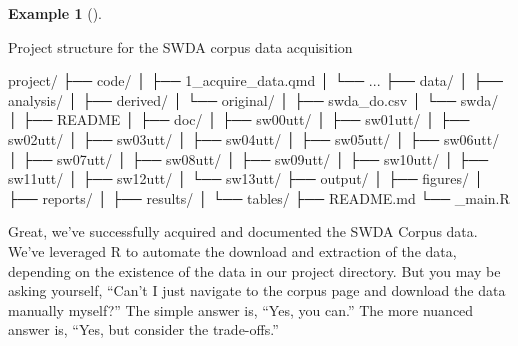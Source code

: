 \documentclass[
  letterpaper,
  DIV=11,
  numbers=noendperiod]{scrreport}
\newenvironment{Shaded}{\begin{snugshade}}{\end{snugshade}}
\newcommand{\ExtensionTok}[1]{\textcolor[rgb]{0.00,0.00,0.00}{#1}}
\newcommand{\NormalTok}[1]{\textcolor[rgb]{0.00,0.00,0.00}{#1}}
\theoremstyle{definition}
\newtheorem{example}{Example}[chapter]
\theoremstyle{remark}
\begin{document}
\begin{example}[]\protect\hypertarget{exm-ad-swda-structure}{}\label{exm-ad-swda-structure}

Project structure for the SWDA corpus data acquisition

\begin{Shaded}
\begin{Highlighting}[]
\ExtensionTok{project/}
\ExtensionTok{├──}\NormalTok{ code/}
\ExtensionTok{│}\NormalTok{   ├── 1\_acquire\_data.qmd}
\ExtensionTok{│}\NormalTok{   └── ...}
\ExtensionTok{├──}\NormalTok{ data/}
\ExtensionTok{│}\NormalTok{   ├── analysis/}
\ExtensionTok{│}\NormalTok{   ├── derived/}
\ExtensionTok{│}\NormalTok{   └── original/}
\ExtensionTok{│}\NormalTok{       ├── swda\_do.csv}
\ExtensionTok{│}\NormalTok{       └── swda/}
\ExtensionTok{│}\NormalTok{          ├── README}
\ExtensionTok{│}\NormalTok{          ├── doc/}
\ExtensionTok{│}\NormalTok{          ├── sw00utt/}
\ExtensionTok{│}\NormalTok{          ├── sw01utt/}
\ExtensionTok{│}\NormalTok{          ├── sw02utt/}
\ExtensionTok{│}\NormalTok{          ├── sw03utt/}
\ExtensionTok{│}\NormalTok{          ├── sw04utt/}
\ExtensionTok{│}\NormalTok{          ├── sw05utt/}
\ExtensionTok{│}\NormalTok{          ├── sw06utt/}
\ExtensionTok{│}\NormalTok{          ├── sw07utt/}
\ExtensionTok{│}\NormalTok{          ├── sw08utt/}
\ExtensionTok{│}\NormalTok{          ├── sw09utt/}
\ExtensionTok{│}\NormalTok{          ├── sw10utt/}
\ExtensionTok{│}\NormalTok{          ├── sw11utt/}
\ExtensionTok{│}\NormalTok{          ├── sw12utt/}
\ExtensionTok{│}\NormalTok{          └── sw13utt/}
\ExtensionTok{├──}\NormalTok{ output/}
\ExtensionTok{│}\NormalTok{   ├── figures/}
\ExtensionTok{│}\NormalTok{   ├── reports/}
\ExtensionTok{│}\NormalTok{   ├── results/}
\ExtensionTok{│}\NormalTok{   └── tables/}
\ExtensionTok{├──}\NormalTok{ README.md}
\ExtensionTok{└──}\NormalTok{ \_main.R}
\end{Highlighting}
\end{Shaded}

\end{example}

Great, we've successfully acquired and documented the SWDA Corpus data.
We've leveraged R to automate the download and extraction of the data,
depending on the existence of the data in our project directory. But you
may be asking yourself, ``Can't I just navigate to the corpus page and
download the data manually myself?'' The simple answer is, ``Yes, you
can.'' The more nuanced answer is, ``Yes, but consider the trade-offs.''
\end{document}
